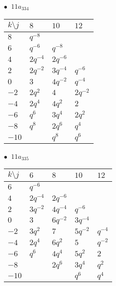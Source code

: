 \begin{minipage}{\linewidth}
$\bullet\ $ $11a_{334}$ \vspace{0.5em} \\
\begin{tabular}{l|lll}
$k \setminus j$ & $8$ & $10$ & $12$ \\
\hline
$8$ & $q^{-8}$ &  &  \\
$6$ & $q^{-6}$ & $q^{-8}$ &  \\
$4$ & $2q^{-4}$ & $2q^{-6}$ &  \\
$2$ & $2q^{-2}$ & $3q^{-4}$ & $q^{-6}$ \\
$0$ & $3$ & $4q^{-2}$ & $q^{-4}$ \\
$-2$ & $2q^{2}$ & $4$ & $2q^{-2}$ \\
$-4$ & $2q^{4}$ & $4q^{2}$ & $2$ \\
$-6$ & $q^{6}$ & $3q^{4}$ & $2q^{2}$ \\
$-8$ & $q^{8}$ & $2q^{6}$ & $q^{4}$ \\
$-10$ &  & $q^{8}$ & $q^{6}$ \\
\end{tabular}
\vspace{2em}
\end{minipage}
%
\begin{minipage}{\linewidth}
$\bullet\ $ $11a_{335}$ \vspace{0.5em} \\
\begin{tabular}{l|llll}
$k \setminus j$ & $6$ & $8$ & $10$ & $12$ \\
\hline
$6$ & $q^{-6}$ &  &  &  \\
$4$ & $2q^{-4}$ & $2q^{-6}$ &  &  \\
$2$ & $3q^{-2}$ & $4q^{-4}$ & $q^{-6}$ &  \\
$0$ & $3$ & $6q^{-2}$ & $3q^{-4}$ &  \\
$-2$ & $3q^{2}$ & $7$ & $5q^{-2}$ & $q^{-4}$ \\
$-4$ & $2q^{4}$ & $6q^{2}$ & $5$ & $q^{-2}$ \\
$-6$ & $q^{6}$ & $4q^{4}$ & $5q^{2}$ & $2$ \\
$-8$ &  & $2q^{6}$ & $3q^{4}$ & $q^{2}$ \\
$-10$ &  &  & $q^{6}$ & $q^{4}$ \\
\end{tabular}
\vspace{2em}
\end{minipage}
%

